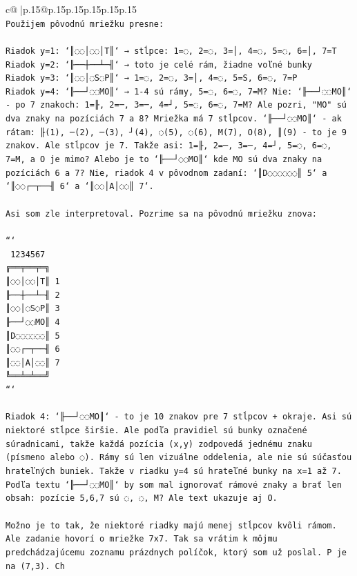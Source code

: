 \documentclass{article}
\begin{document}
{\begin{supertabular}{c@{$\;$}|p{.15\linewidth}@{}p{.15\linewidth}p{.15\linewidth}p{.15\linewidth}p{.15\linewidth}p{.15\linewidth}}
{{{\\ 
\texttt{Použijem pôvodnú mriežku presne:} \\
\\ 
\texttt{Riadok y=1: `║◌◌│◌◌│T║` → stĺpce: 1=◌, 2=◌, 3=│, 4=◌, 5=◌, 6=│, 7=T} \\
\texttt{Riadok y=2: `╟──┼──┴─╢` → toto je celé rám, žiadne voľné bunky} \\
\texttt{Riadok y=3: `║◌◌│◌S◌P║` → 1=◌, 2=◌, 3=│, 4=◌, 5=S, 6=◌, 7=P} \\
\texttt{Riadok y=4: `╟──┘◌◌MO║` → 1{-}4 sú rámy, 5=◌, 6=◌, 7=M? Nie: `╟──┘◌◌MO║` {-} po 7 znakoch: 1=╟, 2=─, 3=─, 4=┘, 5=◌, 6=◌, 7=M? Ale pozri, "MO" sú dva znaky na pozíciách 7 a 8? Mriežka má 7 stĺpcov. `╟──┘◌◌MO║` {-} ak rátam: ╟(1), ─(2), ─(3), ┘(4), ◌(5), ◌(6), M(7), O(8), ║(9) {-} to je 9 znakov. Ale stĺpcov je 7. Takže asi: 1=╟, 2=─, 3=─, 4=┘, 5=◌, 6=◌, 7=M, a O je mimo? Alebo je to `╟──┘◌◌MO║` kde MO sú dva znaky na pozíciách 6 a 7? Nie, riadok 4 v pôvodnom zadaní: `║D◌◌◌◌◌◌║ 5` a `║◌◌┌─┬──╢ 6` a `║◌◌│A│◌◌║ 7`. } \\
\\ 
\texttt{Asi som zle interpretoval. Pozrime sa na pôvodnú mriežku znova:} \\
\\ 
\texttt{```} \\
\texttt{ 1234567} \\
\texttt{╔══╤══╤═╗} \\
\texttt{║◌◌│◌◌│T║ 1} \\
\texttt{╟──┼──┴─╢ 2} \\
\texttt{║◌◌│◌S◌P║ 3} \\
\texttt{╟──┘◌◌MO║ 4} \\
\texttt{║D◌◌◌◌◌◌║ 5} \\
\texttt{║◌◌┌─┬──╢ 6} \\
\texttt{║◌◌│A│◌◌║ 7} \\
\texttt{╚══╧═╧══╝} \\
\texttt{```} \\
\\ 
\texttt{Riadok 4: `╟──┘◌◌MO║` {-} to je 10 znakov pre 7 stĺpcov + okraje. Asi sú niektoré stĺpce širšie. Ale podľa pravidiel sú bunky označené súradnicami, takže každá pozícia (x,y) zodpovedá jednému znaku (písmeno alebo ◌). Rámy sú len vizuálne oddelenia, ale nie sú súčasťou hrateľných buniek. Takže v riadku y=4 sú hrateľné bunky na x=1 až 7. Podľa textu `╟──┘◌◌MO║` by som mal ignorovať rámové znaky a brať len obsah: pozície 5,6,7 sú ◌, ◌, M? Ale text ukazuje aj O. } \\
\\ 
\texttt{Možno je to tak, že niektoré riadky majú menej stĺpcov kvôli rámom. Ale zadanie hovorí o mriežke 7x7. Tak sa vrátim k môjmu predchádzajúcemu zoznamu prázdnych políčok, ktorý som už poslal. P je na (7,3). Ch} \\
            }
        }
    }
     \\ \\


\end{supertabular}}
\end{document}
